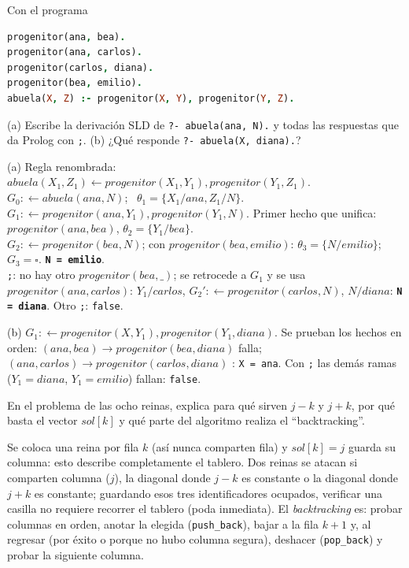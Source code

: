 \begin{prob}[ · A5]
Con el programa
\begin{lstlisting}[language=Prolog]
progenitor(ana, bea).
progenitor(ana, carlos).
progenitor(carlos, diana).
progenitor(bea, emilio).
abuela(X, Z) :- progenitor(X, Y), progenitor(Y, Z).
\end{lstlisting}
(a) Escribe la derivación SLD de \texttt{?- abuela(ana, N).} y todas las respuestas que da Prolog con \texttt{;}.
(b) ¿Qué responde \texttt{?- abuela(X, diana).}?
\end{prob}
\begin{sol}
(a) Regla renombrada: $abuela(X_1,Z_1)\leftarrow progenitor(X_1,Y_1),progenitor(Y_1,Z_1)$.
$G_0:\leftarrow abuela(ana,N)$; \ $\theta_1=\{X_1/ana,Z_1/N\}$.\\
$G_1:\leftarrow progenitor(ana,Y_1),progenitor(Y_1,N)$. Primer hecho que unifica: $progenitor(ana,bea)$, $\theta_2=\{Y_1/bea\}$.\\
$G_2:\leftarrow progenitor(bea,N)$; con $progenitor(bea,emilio)$: $\theta_3=\{N/emilio\}$; $G_3=\square$. \textbf{\texttt{N = emilio}}.\\
\texttt{;}: no hay otro $progenitor(bea,\_)$; se retrocede a $G_1$ y se usa $progenitor(ana,carlos)$: $Y_1/carlos$, $G_2':\leftarrow progenitor(carlos,N)$, $N/diana$: \textbf{\texttt{N = diana}}. Otro \texttt{;}: \texttt{false}.

(b) $G_1:\leftarrow progenitor(X,Y_1),progenitor(Y_1,diana)$. Se prueban los hechos en orden: $(ana,bea)\to progenitor(bea,diana)$ falla; $(ana,carlos)\to progenitor(carlos,diana)$ \checkmark: \texttt{X = ana}. Con \texttt{;} las demás ramas ($Y_1=diana$, $Y_1=emilio$) fallan: \texttt{false}.
\end{sol}

\begin{prob}[ · A6]
En el problema de las ocho reinas, explica para qué sirven $j-k$ y $j+k$, por qué basta el vector $\mathit{sol}[k]$ y qué parte del algoritmo realiza el ``backtracking''.
\end{prob}
\begin{sol}
Se coloca una reina por fila $k$ (así nunca comparten fila) y $\mathit{sol}[k]=j$ guarda su columna: esto describe completamente el tablero. Dos reinas se atacan si comparten columna ($j$), la diagonal donde $j-k$ es constante o la diagonal donde $j+k$ es constante; guardando esos tres identificadores ocupados, verificar una casilla no requiere recorrer el tablero (poda inmediata). El \emph{backtracking} es: probar columnas en orden, anotar la elegida (\texttt{push\_back}), bajar a la fila $k+1$ y, al regresar (por éxito o porque no hubo columna segura), deshacer (\texttt{pop\_back}) y probar la siguiente columna.
\end{sol}

